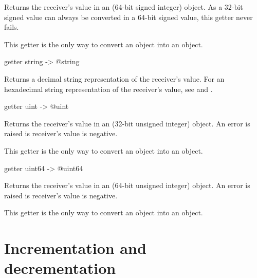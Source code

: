Returns the receiver's value in an  (64-bit signed integer) object. As a 32-bit signed value can always be converted in a 64-bit signed value, this getter never fails.

This getter is the only way to convert an  object into an  object.






\begin{galgascode}
getter string -> @string
\end{galgascode}

Returns a decimal string representation of the receiver's value. For an hexadecimal string representation of the receiver's value, see  and .








\begin{galgascode}
getter uint -> @uint
\end{galgascode}

Returns the receiver's value in an  (32-bit unsigned integer) object. An error is raised is receiver's value is negative.

This getter is the only way to convert an  object into an  object.





\begin{galgascode}
getter uint64 -> @uint64
\end{galgascode}

Returns the receiver's value in an  (64-bit unsigned integer) object. An error is raised is receiver's value is negative.

This getter is the only way to convert an  object into an  object.





\section{Incrementation and decrementation}

